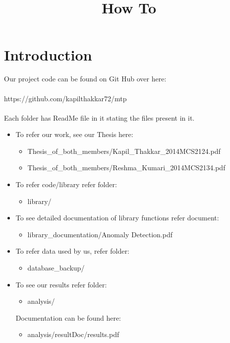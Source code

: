 \documentclass[a4paper,10pt]{article}
\title{How To}
\begin{document}
\maketitle
\section{Introduction}
Our project code can be found on Git Hub over here:\\
\\
https://github.com/kapilthakkar72/mtp\\
\\
Each folder has ReadMe file in it stating the files present in it.

\begin{itemize}

\item To refer our work, see our Thesis here:
	\begin{itemize}
		\item Thesis\_of\_both\_members/Kapil\_Thakkar\_2014MCS2124.pdf
		\item Thesis\_of\_both\_members/Reshma\_Kumari\_2014MCS2134.pdf
	\end{itemize}
	
\item To refer code/library refer folder:
	\begin{itemize}
		\item library/
	\end{itemize}

\item To see detailed documentation of library functions refer document:
	\begin{itemize}
		\item library\_documentation/Anomaly Detection.pdf
	\end{itemize}
	

\item To refer data used by us, refer folder:
	\begin{itemize}
		\item database\_backup/
	\end{itemize}

\item To see our results refer folder:
	\begin{itemize}
		\item analysis/
	\end{itemize}
  Documentation can be found here:
  	\begin{itemize}
		\item analysis/resultDoc/results.pdf
	\end{itemize}
  

\end{itemize}
\end{document}
